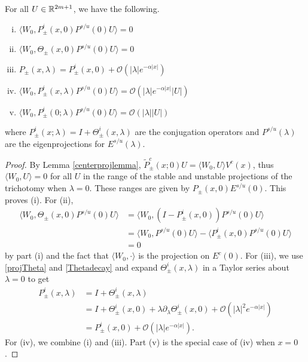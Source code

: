 \documentclass[thesis.tex]{subfiles}
\begin{document}
\begin{lemma}\label{W0projlemma}
For all $U \in \mathbb{R}^{2m+1}$, we have the following.
\begin{enumerate}[(i)]
	\item $\langle W_0, P^i_\pm(x, 0) P^{s/u}(0) U \rangle = 0$
	\item $\langle W_0, \Theta_\pm(x, 0) P^{s/u}(0) U \rangle = 0$
	\item $P_\pm(x, \lambda) = P^i_\pm(x, 0) + \mathcal{O}(|\lambda|e^{-\alpha|x|})$
	\item $\langle W_0, P^i_\pm(x, \lambda) P^{s/u}(0) U \rangle = \mathcal{O}(|\lambda|e^{-\alpha|x|}|U|)$
	\item $\langle W_0, P^i_\pm(0; \lambda) P^{s/u}(0) U \rangle = \mathcal{O}(|\lambda||U|)$
\end{enumerate}
where $P^i_\pm(x; \lambda) = I + \Theta^i_\pm(x, \lambda)$ are the conjugation operators and $P^{s/u}(\lambda)$ are the eigenprojections for $E^{s/u}(\lambda)$.
\begin{proof}
By Lemma \ref{centerprojlemma}, $\tilde{P}_\pm^c(x; 0)U = \langle W_0, U \rangle V^c(x)$, thus $\langle W_0, U \rangle = 0$ for all $U$ in the range of the stable and unstable projections of the trichotomy when $\lambda = 0$. These ranges are given by $P_\pm(x, 0) E^{s/u}(0)$. This proves (i). For (ii), 
\begin{align*}
\langle W_0, \Theta_\pm(x, 0) P^{s/u}(0) U\rangle &=
\langle W_0, (I - P^i_\pm(x, 0)) P^{s/u}(0) U\rangle \\
&= \langle W_0, P^{s/u}(0) U \rangle - \langle P^i_\pm(x, 0)P^{s/u}(0) U \rangle \\
&= 0
\end{align*}
by part (i) and the fact that $\langle W_0, \cdot \rangle$ is the projection on $E^c(0)$. For (iii), we use \cref{projTheta} and \cref{Thetadecay} and expand $\Theta^i_\pm(x, \lambda)$ in a Taylor series about $\lambda = 0$ to get
\begin{align*}
P^i_\pm(x, \lambda) &= I + \Theta^i_\pm(x, \lambda) \\
&= I + \Theta^i_\pm(x, 0) + \lambda \partial_\lambda \Theta^i_\pm(x, 0) + \mathcal{O}(|\lambda|^2 e^{-\alpha |x|} ) \\
&= P^i_\pm(x, 0) + \mathcal{O}(|\lambda|e^{-\alpha|x|}).
\end{align*}
For (iv), we combine (i) and (iii). Part (v) is the special case of (iv) when $x = 0$.
\end{proof}
\end{lemma}

\iffulldocument\else
	
	
\fi
\end{document}
